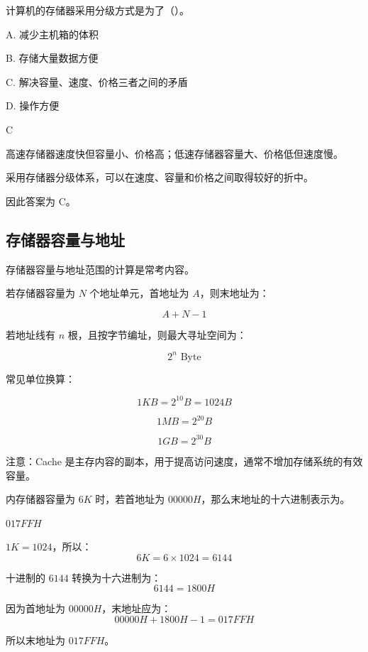 \begin{question}
计算机的存储器采用分级方式是为了（）。

A. 减少主机箱的体积

B. 存储大量数据方便

C. 解决容量、速度、价格三者之间的矛盾

D. 操作方便
\end{question}

\begin{answer}
C
\end{answer}

\begin{analysisenv}
高速存储器速度快但容量小、价格高；低速存储器容量大、价格低但速度慢。

采用存储器分级体系，可以在速度、容量和价格之间取得较好的折中。

因此答案为 C。
\end{analysisenv}


\subsection{存储器容量与地址}

\begin{knowledge}
存储器容量与地址范围的计算是常考内容。

若存储器容量为 $N$ 个地址单元，首地址为 $A$，则末地址为：

\[
A+N-1
\]

若地址线有 $n$ 根，且按字节编址，则最大寻址空间为：

\[
2^n\text{ Byte}
\]

常见单位换算：

\[
1KB=2^{10}B=1024B
\]

\[
1MB=2^{20}B
\]

\[
1GB=2^{30}B
\]

注意：Cache 是主存内容的副本，用于提高访问速度，通常不增加存储系统的有效容量。
\end{knowledge}


\begin{question}
内存储器容量为 $6K$ 时，若首地址为 $00000H$，那么末地址的十六进制表示为\underline{\hspace{3cm}}。
\end{question}

\begin{answer}
$017FFH$
\end{answer}

\begin{analysisenv}
$1K = 1024$，所以：
\[
6K = 6 \times 1024 = 6144
\]

十进制的 $6144$ 转换为十六进制为：
\[
6144 = 1800H
\]

因为首地址为 $00000H$，末地址应为：
\[
00000H + 1800H - 1 = 017FFH
\]

所以末地址为 $017FFH$。
\end{analysisenv}


